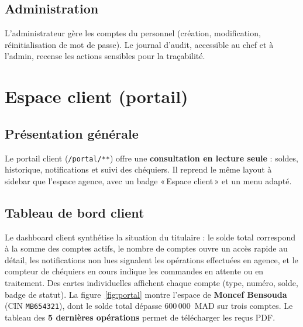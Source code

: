 \documentclass[11pt,a4paper,oneside]{report}
\begin{document}

\subsection{Administration}

L'administrateur gère les comptes du personnel (création, modification, réinitialisation de mot de passe). Le journal d'audit, accessible au chef et à l'admin, recense les actions sensibles pour la traçabilité.


\section{Espace client (portail)}

\subsection{Présentation générale}

Le portail client (\texttt{/portal/**}) offre une \textbf{consultation en lecture seule} : soldes, historique, notifications et suivi des chéquiers. Il reprend le même layout à sidebar que l'espace agence, avec un badge «\,Espace client\,» et un menu adapté.

\subsection{Tableau de bord client}

Le dashboard client synthétise la situation du titulaire : le solde total correspond à la somme des comptes actifs, le nombre de comptes ouvre un accès rapide au détail, les notifications non lues signalent les opérations effectuées en agence, et le compteur de chéquiers en cours indique les commandes en attente ou en traitement. Des cartes individuelles affichent chaque compte (type, numéro, solde, badge de statut). La figure~\ref{fig:portal} montre l'espace de \textbf{Moncef Bensouda} (CIN \texttt{MB654321}), dont le solde total dépasse 600\,000~MAD sur trois comptes. Le tableau des \textbf{5 dernières opérations} permet de télécharger les reçus PDF.
\end{document}
